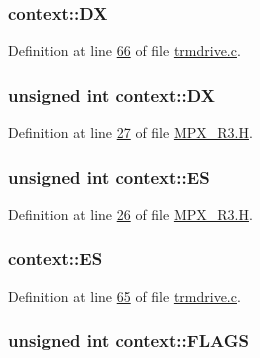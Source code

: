 \hypertarget{structcontext_ae026892abe9326a36108fcaeb08a4436}{
\subsubsection[{DX}]{ {\bf context::DX}}}
\label{structcontext_ae026892abe9326a36108fcaeb08a4436}


Definition at line \hyperlink{trmdrive_8c_source_l00066}{66} of file \hyperlink{trmdrive_8c_source}{trmdrive.c}.

\hypertarget{structcontext_a520e6d1f4fcf543e914e536248da306e}{
\subsubsection[{DX}]{\setlength{\rightskip}{0pt plus 5cm}unsigned int {\bf context::DX}}}
\label{structcontext_a520e6d1f4fcf543e914e536248da306e}


Definition at line \hyperlink{_m_p_x___r3_8_h_source_l00027}{27} of file \hyperlink{_m_p_x___r3_8_h_source}{MPX\_\-R3.H}.

\hypertarget{structcontext_a81a78fef7bda3a5dd852b28a905890ab}{
\subsubsection[{ES}]{\setlength{\rightskip}{0pt plus 5cm}unsigned int {\bf context::ES}}}
\label{structcontext_a81a78fef7bda3a5dd852b28a905890ab}


Definition at line \hyperlink{_m_p_x___r3_8_h_source_l00026}{26} of file \hyperlink{_m_p_x___r3_8_h_source}{MPX\_\-R3.H}.

\hypertarget{structcontext_ae9f446d99a98ca9ca9c448a2ff4066bf}{
\subsubsection[{ES}]{ {\bf context::ES}}}
\label{structcontext_ae9f446d99a98ca9ca9c448a2ff4066bf}


Definition at line \hyperlink{trmdrive_8c_source_l00065}{65} of file \hyperlink{trmdrive_8c_source}{trmdrive.c}.

\hypertarget{structcontext_a251dc5ae40a989bef945d2df6925f9a3}{
\subsubsection[{FLAGS}]{\setlength{\rightskip}{0pt plus 5cm}unsigned int {\bf context::FLAGS}}}
\label{structcontext_a251dc5ae40a989bef945d2df6925f9a3}


